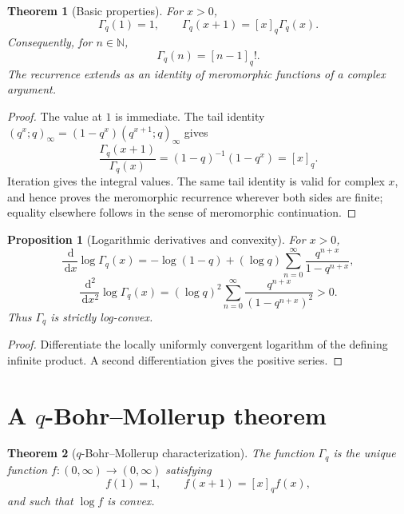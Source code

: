 \documentclass[11pt,oneside,openany]{book}
\newtheorem{theorem}{Theorem}[chapter]
\newtheorem{proposition}[proposition]{Proposition}
\theoremstyle{definition}
\theoremstyle{remark}
\newcommand{\N}{\mathbb N}
\newcommand{\dd}{\,\mathrm d}
\begin{document}
\begin{theorem}[Basic properties]\label{thm:qgamma-basic}
For $x>0$,
\[
 \Gamma_q(1)=1,
 \qquad
 \Gamma_q(x+1)=[x]_q\Gamma_q(x).
\]
Consequently, for $n\in\N$,
\[
 \Gamma_q(n)=[n-1]_q!.
\]
The recurrence extends as an identity of meromorphic functions of a
complex argument.
\end{theorem}

\begin{proof}
The value at $1$ is immediate.  The tail identity
\(
 (q^x;q)_\infty=(1-q^x)(q^{x+1};q)_\infty
\)
gives
\[
 \frac{\Gamma_q(x+1)}{\Gamma_q(x)}
 =(1-q)^{-1}(1-q^x)=[x]_q.
\]
Iteration gives the integral values.  The same tail identity is valid for
complex $x$, and hence proves the meromorphic recurrence wherever both
sides are finite; equality elsewhere follows in the sense of
meromorphic continuation.
\end{proof}

\begin{proposition}[Logarithmic derivatives and convexity]\label{prop:qgamma-convex}
For $x>0$,
\[
 \frac{\dd}{\dd x}\log\Gamma_q(x)
 =-\log(1-q)+(\log q)\sum_{n=0}^{\infty}
 \frac{q^{n+x}}{1-q^{n+x}},
\]
\[
 \frac{\dd^2}{\dd x^2}\log\Gamma_q(x)
 = (\log q)^2\sum_{n=0}^{\infty}
 \frac{q^{n+x}}{(1-q^{n+x})^2}>0.
\]
Thus $\Gamma_q$ is strictly log-convex.
\end{proposition}

\begin{proof}
Differentiate the locally uniformly convergent logarithm of the defining infinite product.  A second differentiation gives the positive series.
\end{proof}

\section{A \texorpdfstring{$q$}{q}-Bohr--Mollerup theorem}

\begin{theorem}[$q$-Bohr--Mollerup characterization]\label{thm:q-bohr-mollerup}
The function $\Gamma_q$ is the unique function $f:(0,\infty)\to(0,\infty)$ satisfying
\[
 f(1)=1,
 \qquad
 f(x+1)=[x]_qf(x),
\]
and such that $\log f$ is convex.
\end{theorem}
\end{document}
